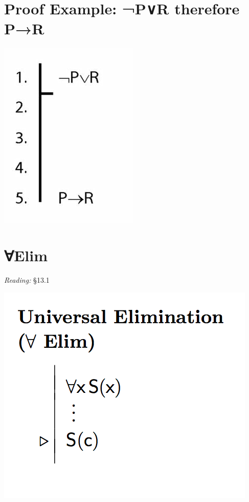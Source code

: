 \documentclass[12pt]{extarticle}
\begin{document}
\begin{multicols*}{3}
 
 
\section{Proof Example: ¬P∨R therefore P→R}
 
\begin{center}
\includegraphics[scale=0.3]{img/unit_320_proof.png}
\end{center}
 
 
\section{∀Elim}
 
\emph{Reading:} §13.1
 
\begin{center}
\includegraphics[scale=0.3]{img/rule_universal_elim.png}
\end{center}
\vfill
\begin{minipage}{\columnwidth}

\end{minipage}
\end{multicols*}
\end{document}

